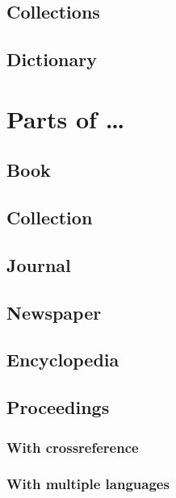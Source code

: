 \documentclass[a4paper]{article}
\begin{document}
\subsection{Collections}

\subsection{Dictionary}


\section{Parts of \ldots}

\subsection{Book}

\subsection{Collection}

\subsection{Journal}

\subsection{Newspaper}

\subsection{Encyclopedia}

\subsection{Proceedings}

\subsubsection{With crossreference}

\subsubsection{With multiple languages}
\end{document}
